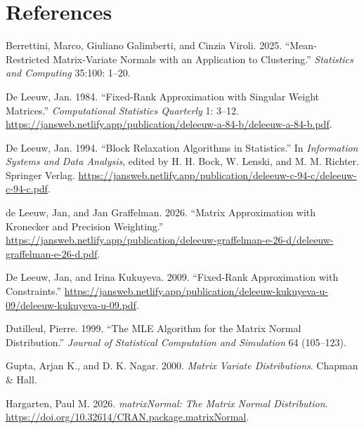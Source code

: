 \documentclass[
  12pt,
  letterpaper,
  DIV=11,
  numbers=noendperiod]{scrartcl}
\newlength{\cslhangindent}
\newenvironment{CSLReferences}[2] %
 {\begin{list}{}{%
  \setlength{\itemindent}{0pt}
  \setlength{\leftmargin}{0pt}
  \setlength{\parsep}{0pt}
  \ifodd #1
   \setlength{\leftmargin}{\cslhangindent}
   \setlength{\itemindent}{-1\cslhangindent}
  \fi
  \setlength{\itemsep}{#2\baselineskip}}}
 {\end{list}}
\newcommand{\sectionbreak}{\clearpage}
\begin{document}
\sectionbreak

\section*{References}\label{references}

\protect{}\label{refs}
\begin{CSLReferences}{1}{1}
Berrettini, Marco, Giuliano Galimberti, and Cinzia Viroli. 2025.
{``Mean-Restricted Matrix-Variate Normals with an Application to
Clustering.''} \emph{Statistics and Computing} 35:100: 1--20.

De Leeuw, Jan. 1984. {``Fixed-Rank Approximation with Singular Weight
Matrices.''} \emph{Computational Statistics Quarterly} 1: 3--12.
\url{https://jansweb.netlify.app/publication/deleeuw-a-84-b/deleeuw-a-84-b.pdf}.

De Leeuw, Jan. 1994. {``{Block Relaxation Algorithms in Statistics}.''}
In \emph{Information Systems and Data Analysis}, edited by H. H. Bock,
W. Lenski, and M. M. Richter. Springer Verlag.
\url{https://jansweb.netlify.app/publication/deleeuw-c-94-c/deleeuw-c-94-c.pdf}.

{de Leeuw, Jan, and Jan Graffelman}. 2026. {``Matrix Approximation with
Kronecker and Precision Weighting.''}
\url{https://jansweb.netlify.app/publication/deleeuw-graffelman-e-26-d/deleeuw-graffelman-e-26-d.pdf}.

De Leeuw, Jan, and Irina Kukuyeva. 2009. {``{Fixed-Rank Approximation
with Constraints}.''}
\url{https://jansweb.netlify.app/publication/deleeuw-kukuyeva-u-09/deleeuw-kukuyeva-u-09.pdf}.

Dutilleul, Pierre. 1999. {``The MLE Algorithm for the Matrix Normal
Distribution.''} \emph{Journal of Statistical Computation and
Simulation} 64 (105--123).

Gupta, Arjan K., and D. K. Nagar. 2000. \emph{Matrix Variate
Distributions}. {Chapman \& Hall}.

Hargarten, Paul M. 2026. \emph{matrixNormal: The Matrix Normal
Distribution}. \url{https://doi.org/10.32614/CRAN.package.matrixNormal}.


\end{CSLReferences}
\end{document}
